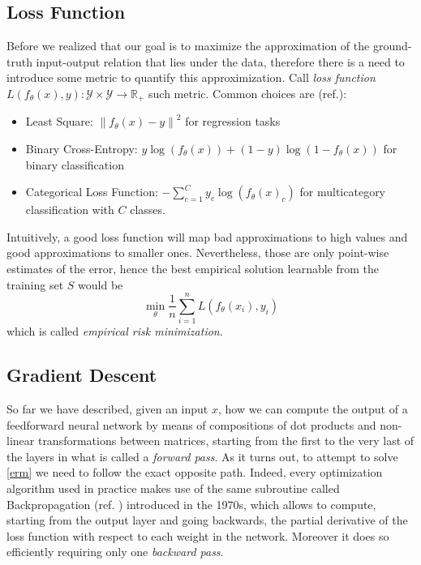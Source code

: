 \documentclass[LaM,binding=0.6cm]{./packages/sapthesis/sapthesis}
\newcommand{\norm}[1]{\left\lVert#1\right\rVert}
\begin{document}
            \subsection{Loss Function}
                Before we realized that our goal is to maximize the approximation of the ground-truth input-output relation that lies under the data, therefore there is a need to
                introduce some metric to quantify this approximization. Call \textit{loss function} $ L(f_{\theta}\left(x\right), y) \colon \mathcal{Y} \times \mathcal{Y} \to \mathbb{R_+}$ 
                such metric. Common choices are (ref.):
                \begin{itemize}
                    \item Least Square: $\norm{f_{\theta}\left(x\right) - y}^2$ for regression tasks 
                    \item Binary Cross-Entropy: $y \log (f_{\theta}(x))+(1-y) \log (1-f_{\theta}(x))$ for binary classification  
                    \item Categorical Loss Function: $-\sum_{c=1}^{C} y_{c} \log \left(f_{\theta}(x)_c\right)$ for multicategory classification with $C$ classes.
                \end{itemize}
                Intuitively, a good loss function will map bad approximations to high values and good approximations to smaller ones.
                Nevertheless, those are only point-wise estimates of the error, hence the best empirical solution learnable from the training set $ S $ would be 
                \begin{equation}
                    \label{erm}
                    \displaystyle{  \min_{\theta}  \frac{1}{n} \sum_{i=1}^{n} L\left(f_{\theta}\left(x_{i}\right), y_{i}\right) }
                \end{equation}
                which is called \textit{empirical risk minimization}.
            \subsection{Gradient Descent}
               So far we have described, given an input $ x $, how we can compute the output of a feedforward neural network by means of compositions of dot products 
               and non-linear transformations between matrices, starting from the first to the very last of the layers in what is called a \textit{forward pass}. As it turns out, to attempt to solve \ref{erm} we need to follow the exact
               opposite path. Indeed, every optimization algorithm used in practice makes use of the same subroutine called Backpropagation (ref.  ) introduced in the 1970s, which allows to compute, starting from the output layer
               and going backwards, the partial derivative of the loss function with respect to each weight in the network. Moreover it does so efficiently requiring only one \textit{backward pass}.
\end{document}

